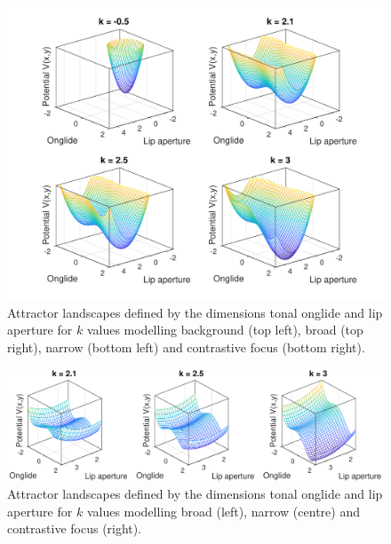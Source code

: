 \begin{figure}[htbp]
\begin{center}
\includegraphics[width=\textwidth]{figures/ch7/3d_landscapes1.pdf}
\caption[Attractor landscapes defined by the dimensions tonal onglide and lip aperture for background, broad, narrow and contrastive focus.]{Attractor landscapes defined by the dimensions tonal onglide and lip aperture for $k$ values modelling background (top left), broad (top right), narrow (bottom left) and contrastive focus (bottom right).}
\label{fig:3d_landscapes1}
\end{center}
\end{figure}

\begin{figure}[htbp]
\begin{center}
\includegraphics[width=\textwidth]{figures/ch7/3d_landscapes2.pdf}
\caption[Attractor landscapes defined by the dimensions tonal onglide and lip aperture for broad, narrow and contrastive focus.]{Attractor landscapes defined by the dimensions tonal onglide and lip aperture for $k$ values modelling broad (left), narrow (centre) and contrastive focus (right).}
\label{fig:3d_landscapes2}
\end{center}
\end{figure}

